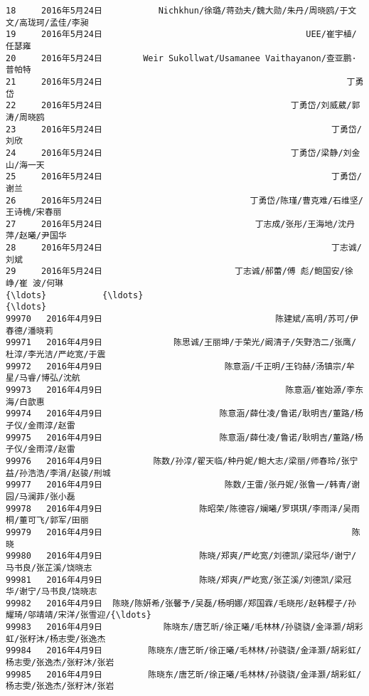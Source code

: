 \documentclass[11pt]{article}
\begin{document}
\begin{Verbatim}[commandchars=\\\{\}]
18     2016年5月24日           Nichkhun/徐璐/蒋劲夫/魏大勋/朱丹/周晓鸥/于文文/高珑珂/孟佳/李昶   
19     2016年5月24日                                        UEE/崔宇植/任瑟雍   
20     2016年5月24日        Weir Sukollwat/Usamanee Vaithayanon/查亚鹏·普帕特   
21     2016年5月24日                                                丁勇岱   
22     2016年5月24日                                     丁勇岱/刘威葳/郭涛/周晓鸥   
23     2016年5月24日                                             丁勇岱/刘欣   
24     2016年5月24日                                     丁勇岱/梁静/刘金山/海一天   
25     2016年5月24日                                             丁勇岱/谢兰   
26     2016年5月24日                             丁勇岱/陈瑾/曹克难/石维坚/王诗槐/宋春丽   
27     2016年5月24日                              丁志成/张彤/王海地/沈丹萍/赵曦/尹国华   
28     2016年5月24日                                             丁志诚/刘斌   
29     2016年5月24日                          丁志诚/郝蕾/傅 彪/鲍国安/徐 峥/崔 波/何琳   
{\ldots}           {\ldots}                                                {\ldots}   
99970   2016年4月9日                                  陈建斌/高明/苏可/伊春德/潘晓莉   
99971   2016年4月9日              陈思诚/王丽坤/于荣光/阚清子/矢野浩二/张鹰/杜淳/李光洁/严屹宽/于震   
99972   2016年4月9日                        陈意涵/千正明/王钧赫/汤镇宗/牟星/马睿/博弘/沈航   
99973   2016年4月9日                                    陈意涵/崔始源/李东海/白歆惠   
99974   2016年4月9日                       陈意涵/薛仕凌/鲁诺/耿明吉/董路/杨子仪/金雨淳/赵雷   
99975   2016年4月9日                       陈意涵/薛仕凌/鲁诺/耿明吉/董路/杨子仪/金雨淳/赵雷   
99976   2016年4月9日          陈数/孙淳/翟天临/种丹妮/鲍大志/梁丽/师春玲/张宁益/孙浩浩/李涓/赵骏/刑城   
99977   2016年4月9日                        陈数/王雷/张丹妮/张鲁一/韩青/谢园/马澜菲/张小磊   
99978   2016年4月9日                   陈昭荣/陈德容/斓曦/罗琪琪/李雨泽/吴雨桐/董可飞/郭军/田丽   
99979   2016年4月9日                                                 陈晓   
99980   2016年4月9日                   陈晓/郑爽/严屹宽/刘德凯/梁冠华/谢宁/马书良/张芷溪/饶晓志   
99981   2016年4月9日                   陈晓/郑爽/严屹宽/张芷溪/刘德凯/梁冠华/谢宁/马书良/饶晓志   
99982   2016年4月9日  陈晓/陈妍希/张馨予/吴磊/杨明娜/郑国霖/毛晓彤/赵韩樱子/孙耀琦/邬靖靖/宋洋/张雪迎/{\ldots}   
99983   2016年4月9日            陈晓东/唐艺昕/徐正曦/毛林林/孙骁骁/金泽灏/胡彩虹/张籽沐/杨志雯/张逸杰   
99984   2016年4月9日         陈晓东/唐艺昕/徐正曦/毛林林/孙骁骁/金泽灏/胡彩虹/杨志雯/张逸杰/张籽沐/张岩   
99985   2016年4月9日         陈晓东/唐艺昕/徐正曦/毛林林/孙骁骁/金泽灏/胡彩虹/杨志雯/张逸杰/张籽沐/张岩   

\end{Verbatim}
\end{document}
